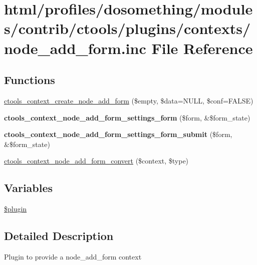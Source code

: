 \hypertarget{node__add__form_8inc}{
\section{html/profiles/dosomething/modules/contrib/ctools/plugins/contexts/node\_\-add\_\-form.inc File Reference}
\label{node__add__form_8inc}
}
\subsection*{Functions}
\begin{DoxyCompactItemize}
\item 
\hyperlink{node__add__form_8inc_a242e82f6988936da9573ed8f324bcf8c}{ctools\_\-context\_\-create\_\-node\_\-add\_\-form} (\$empty, \$data=NULL, \$conf=FALSE)
\item 
\hypertarget{node__add__form_8inc_a2a9d9087e9cb9dd37f13517bae89b9f1}{
{\bfseries ctools\_\-context\_\-node\_\-add\_\-form\_\-settings\_\-form} (\$form, \&\$form\_\-state)}
\label{node__add__form_8inc_a2a9d9087e9cb9dd37f13517bae89b9f1}

\item 
\hypertarget{node__add__form_8inc_a3a5c8e6612963919729222f52e3ccdd5}{
{\bfseries ctools\_\-context\_\-node\_\-add\_\-form\_\-settings\_\-form\_\-submit} (\$form, \&\$form\_\-state)}
\label{node__add__form_8inc_a3a5c8e6612963919729222f52e3ccdd5}

\item 
\hyperlink{node__add__form_8inc_afc396df3820b41516cf8cb374200f256}{ctools\_\-context\_\-node\_\-add\_\-form\_\-convert} (\$context, \$type)
\end{DoxyCompactItemize}
\subsection*{Variables}
\begin{DoxyCompactItemize}
\item 
\hyperlink{node__add__form_8inc_ada8a7130088351710bb02ed622d6bf65}{\$plugin}
\end{DoxyCompactItemize}


\subsection{Detailed Description}
Plugin to provide a node\_\-add\_\-form context 

